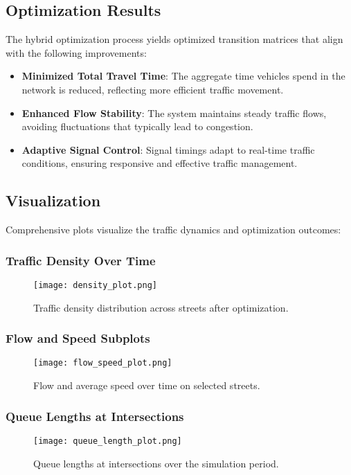 \documentclass[conference]{IEEEtran}
\begin{document}
\subsection{Optimization Results}
The hybrid optimization process yields optimized transition matrices that align with the following improvements:
\begin{itemize}
    \item \textbf{Minimized Total Travel Time}: The aggregate time vehicles spend in the network is reduced, reflecting more efficient traffic movement.
    \item \textbf{Enhanced Flow Stability}: The system maintains steady traffic flows, avoiding fluctuations that typically lead to congestion.
    \item \textbf{Adaptive Signal Control}: Signal timings adapt to real-time traffic conditions, ensuring responsive and effective traffic management.
\end{itemize}

\subsection{Visualization}

Comprehensive plots visualize the traffic dynamics and optimization outcomes:

\subsubsection{Traffic Density Over Time}
\begin{figure}[h]
    \centering
    \texttt{[image: density\_plot.png]}
    \caption{Traffic density distribution across streets after optimization.}
\end{figure}

\subsubsection{Flow and Speed Subplots}
\begin{figure}[h]
    \centering
    \texttt{[image: flow\_speed\_plot.png]}
    \caption{Flow and average speed over time on selected streets.}
\end{figure}

\subsubsection{Queue Lengths at Intersections}
\begin{figure}[h]
    \centering
    \texttt{[image: queue\_length\_plot.png]}
    \caption{Queue lengths at intersections over the simulation period.}
\end{figure}
\end{document}
